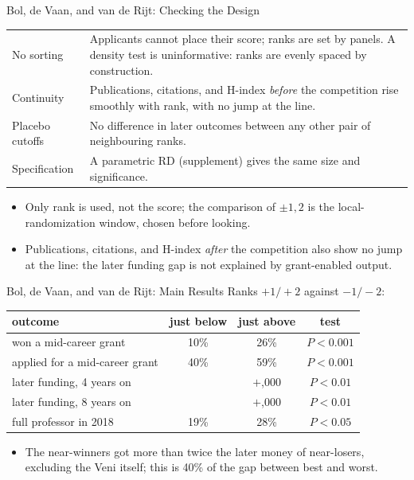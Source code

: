 \documentclass[aspectratio=169,11pt,xcolor=dvipsnames]{beamer}
\begin{document}
\begin{frame}{Bol, de Vaan, and van de Rijt: Checking the Design}
\begin{center}\footnotesize
\renewcommand{\arraystretch}{1.15}
\begin{tabular}{@{}l>{\raggedright\arraybackslash}p{10.6cm}@{}}
\toprule
No sorting & Applicants cannot place their score; ranks are set by panels. A
  density test is uninformative: ranks are evenly spaced by construction. \\
Continuity & Publications, citations, and H-index \emph{before} the competition
  rise smoothly with rank, with no jump at the line. \\
Placebo cutoffs & No difference in later outcomes between any other pair of
  neighbouring ranks. \\
Specification & A parametric RD (supplement) gives the same size and
  significance. \\
\bottomrule
\end{tabular}
\end{center}
\vskip3pt
\begin{itemize}\itemsep2pt
  \item Only rank is used, not the score; the comparison of $\pm 1, 2$ is the
        local-randomization window, chosen before looking.
  \item Publications, citations, and H-index \emph{after} the competition also show no
        jump at the line: the later funding gap is not explained by grant-enabled output.
\end{itemize}
\end{frame}

\begin{frame}{Bol, de Vaan, and van de Rijt: Main Results}
Ranks $+1/+2$ against $-1/-2$:
\vskip3pt
\begin{center}\small
\renewcommand{\arraystretch}{1.12}
\begin{tabular}{@{}lccc@{}}
\toprule
outcome & just below & just above & test \\
\midrule
won a mid-career grant & 10\% & 26\% & $P < 0.001$ \\
applied for a mid-career grant & 40\% & 59\% & $P < 0.001$ \\
later funding, 4 years on & & $+$\texteuro40,000 & $P < 0.01$ \\
later funding, 8 years on & & $+$\texteuro180,000 & $P < 0.01$ \\
full professor in 2018 & 19\% & 28\% & $P < 0.05$ \\
\bottomrule
\end{tabular}
\end{center}
\vskip2pt
\begin{itemize}\itemsep2pt
  \item The near-winners got more than twice the later money of near-losers,
        excluding the Veni itself; this is 40\% of the gap between best and worst.
\end{itemize}
\end{frame}
\end{document}
